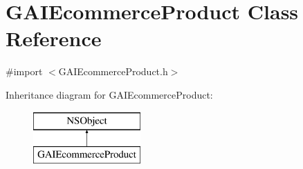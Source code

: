 \hypertarget{interface_g_a_i_ecommerce_product}{}\section{G\+A\+I\+Ecommerce\+Product Class Reference}
\label{interface_g_a_i_ecommerce_product}


{\ttfamily \#import $<$G\+A\+I\+Ecommerce\+Product.\+h$>$}

Inheritance diagram for G\+A\+I\+Ecommerce\+Product\+:\begin{figure}[H]
\begin{center}
\leavevmode
\includegraphics[height=2.000000cm]{interface_g_a_i_ecommerce_product}
\end{center}
\end{figure}
